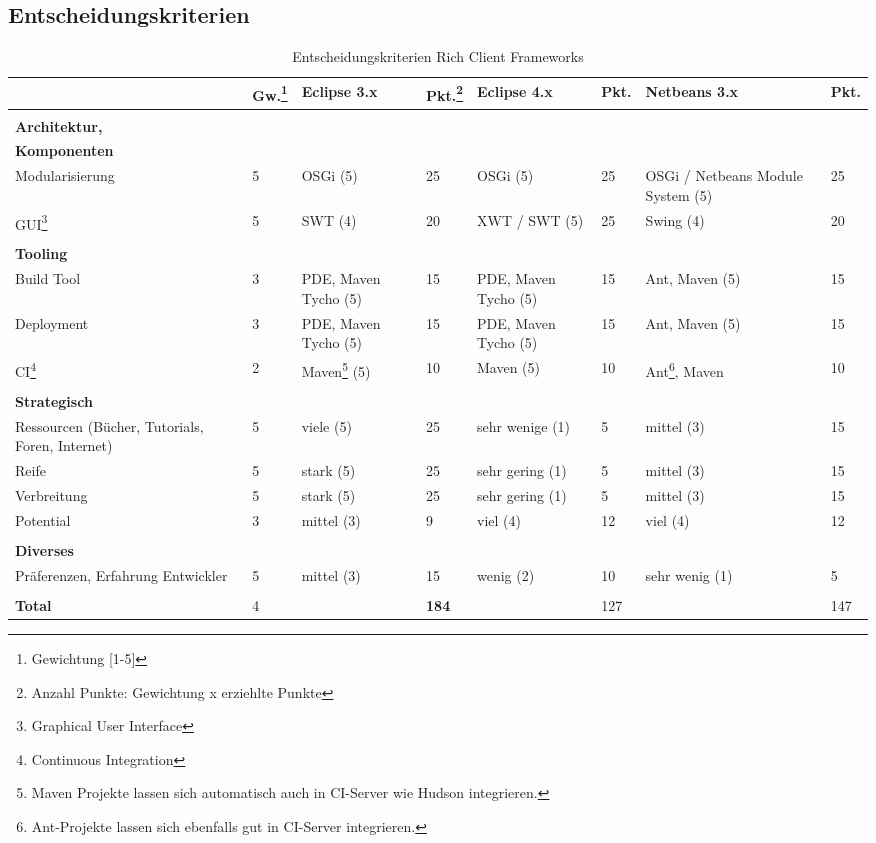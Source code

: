 \subsection{Entscheidungskriterien}
\begin{longtable}{|p{2.8cm}|p{0.7cm}|p{2.1cm}|p{0.7cm}|p{2.1cm}|p{0.7cm}|p{2.2cm}|p{0.7cm}|}
    \caption{Entscheidungskriterien Rich Client Frameworks}\\\hline
  & \textbf{Gw.\footnote{Gewichtung [1-5]}} & \textbf{Eclipse 3.x}& \textbf{Pkt.\footnote{Anzahl Punkte: Gewichtung x erziehlte Punkte}} & \textbf{Eclipse 4.x} &\textbf{Pkt.} & \textbf{Netbeans 3.x}& \textbf{Pkt.}\\\hline
 \multicolumn{8}{|l|}{}\\  
\multicolumn{8}{|l|}{\textbf{Architektur,}}\\
  \multicolumn{8}{|l|}{\textbf{Komponenten}}\\\hline
  Modularisierung &5 & OSGi (5) & 25 & OSGi (5) & 25 & OSGi / Netbeans Module System (5) & 25\\\hline
  GUI\footnote{Graphical User Interface} &5 & SWT (4) & 20 & XWT / SWT (5) & 25 & Swing (4) & 20\\\hline
  \multicolumn{8}{|l|}{}\\
  \multicolumn{8}{|l|}{\textbf{Tooling}}\\\hline
  Build Tool &3 & PDE, Maven Tycho (5) & 15 & PDE, Maven Tycho (5) & 15 & Ant, Maven (5) & 15\\\hline
  Deployment & 3 & PDE, Maven Tycho (5) & 15 & PDE, Maven Tycho (5) & 15 & Ant, Maven (5)& 15\\\hline
 CI\footnote{Continuous Integration} &2 & Maven\footnote{Maven Projekte lassen sich automatisch auch in CI-Server wie Hudson integrieren.} (5) & 10 &Maven (5) & 10& Ant\footnote{Ant-Projekte lassen sich ebenfalls gut in CI-Server integrieren.}, Maven & 10\\\hline 
 \multicolumn{8}{|l|}{}\\
\multicolumn{8}{|l|}{\textbf{Strategisch}}\\\hline
  Ressourcen (Bücher, Tutorials, Foren, Internet) & 5 & viele (5) & 25 & sehr wenige (1) &5&mittel (3)&15 \\\hline
  Reife & 5 & stark (5) & 25 & sehr gering (1) &5&mittel (3)&15 \\\hline
  Verbreitung & 5 & stark (5) & 25 & sehr gering (1) &5&mittel (3)&15 \\\hline
  Potential & 3 & mittel (3) & 9 & viel (4)  & 12 & viel (4)&12 \\\hline
 \multicolumn{8}{|l|}{}\\
\multicolumn{8}{|l|}{\textbf{Diverses}}\\\hline
  Präferenzen, Erfahrung Entwickler & 5 & mittel (3) & 15 & wenig (2) &10&sehr wenig (1)&5 \\\hline
 \multicolumn{8}{|l|}{}\\\hline 
 \textbf{Total} & 4 & &\textbf{184}&&127& & 147 \\\hline
\end{longtable}


